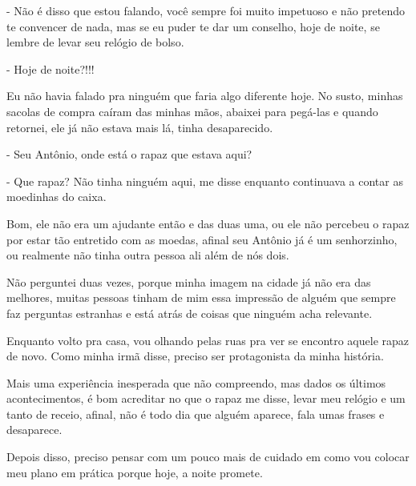 - Não é disso que estou falando, você sempre foi muito impetuoso e não pretendo te convencer de nada, mas se eu puder te dar um conselho, hoje de noite, se lembre de levar seu relógio de bolso.

- Hoje de noite?!!!

Eu não havia falado pra ninguém que faria algo diferente hoje. No susto, minhas sacolas de compra caíram das minhas mãos, abaixei para pegá-las e quando retornei, ele já não estava mais lá, tinha desaparecido.

- Seu Antônio, onde está o rapaz que estava aqui? 

- Que rapaz? Não tinha ninguém aqui, me disse enquanto continuava a contar as moedinhas do caixa.

Bom, ele não era um ajudante então e das duas uma, ou ele não percebeu o rapaz por estar tão entretido com as moedas, afinal seu Antônio já é um senhorzinho, ou realmente não tinha outra pessoa ali além de nós dois.

Não perguntei duas vezes, porque minha imagem na cidade já não era das melhores, muitas pessoas tinham de mim essa impressão de alguém que sempre faz perguntas estranhas e está atrás de coisas que ninguém acha relevante. 

Enquanto volto pra casa, vou olhando pelas ruas pra ver se encontro aquele rapaz de novo. Como minha irmã disse, preciso ser protagonista da minha história.

Mais uma experiência inesperada que não compreendo, mas dados os últimos acontecimentos, é bom acreditar no que o rapaz me disse, levar meu relógio e um tanto de receio, afinal, não é todo dia que alguém aparece, fala umas frases e desaparece. 

Depois disso, preciso pensar com um pouco mais de cuidado em como vou colocar meu plano em prática porque hoje, a noite promete.


